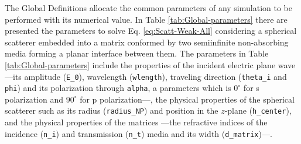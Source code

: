 The Global Definitions allocate the common parameters of any simulation to be performed with its numerical value. In Table \ref{tab:Global-parameters} there are presented the parameters to solve Eq. \eqref{eq:Scatt-Weak-All} considering a spherical scatterer embedded into a matrix conformed by two semiinfinite non-absorbing media forming a planar interface between them. The parameters in Table \ref{tab:Global-parameters} include the properties of the incident electric plane wave ---its amplitude (\lstinline!E_0!),  wavelength (\lstinline!wlength!), traveling direction (\lstinline!theta_i! and \lstinline!phi!) and its polarization through \lstinline!alpha!, a parameters which is $0^\circ$ for s polarization and $90^\circ$ for p polarization---, the physical properties of the spherical scatterer such as its radius  (\lstinline!radius_NP!) and position in the $z$-plane (\lstinline!h_center!), and the physical properties of the matrices ---the refractive indices of the incidence (\lstinline!n_i!) and transmission (\lstinline!n_t!) media and its width (\lstinline!d_matrix!)---.

